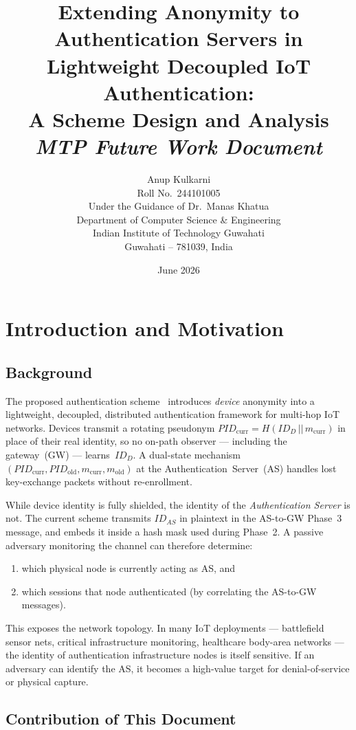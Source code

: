 \documentclass[12pt,a4paper]{article}
\title{%
  \textbf{Extending Anonymity to Authentication Servers in
  Lightweight Decoupled IoT Authentication:}\\[4pt]
  \large A Scheme Design and Analysis\\[8pt]
  \normalsize\textit{MTP Future Work Document}%
}
\author{%
  Anup Kulkarni\\
  Roll No.\ 244101005\\[4pt]
  Under the Guidance of Dr.\ Manas Khatua\\[4pt]
  Department of Computer Science \& Engineering\\
  Indian Institute of Technology Guwahati\\
  Guwahati -- 781039, India
}
\date{June 2026}
\newcommand{\IDd}{\mathit{ID}_D}
\newcommand{\IDas}{\mathit{ID}_{AS}}
\newcommand{\PIDcurr}{\mathit{PID}_{\mathrm{curr}}}
\newcommand{\PIDown}{\mathit{PID}_{\mathrm{old}}}
\newcommand{\mcurr}{m_{\mathrm{curr}}}
\newcommand{\mold}{m_{\mathrm{old}}}
\begin{document}
\maketitle
\tableofcontents
\newpage

\section{Introduction and Motivation}

\subsection{Background}

The proposed authentication scheme~\cite{das2026comsnets} introduces
\emph{device} anonymity into a lightweight, decoupled, distributed
authentication framework for multi-hop IoT networks.
Devices transmit a rotating pseudonym
$\PIDcurr = H(\IDd \,||\, \mcurr)$ in place of their real identity,
so no on-path observer --- including the gateway~(GW) --- learns~$\IDd$.
A dual-state mechanism~$(\PIDcurr, \PIDown, \mcurr, \mold)$ at the
Authentication~Server~(AS) handles lost key-exchange packets without
re-enrollment.

While device identity is fully shielded, the identity of the
\emph{Authentication Server} is not.
The current scheme transmits $\IDas$ in plaintext in the AS-to-GW
Phase~3 message, and embeds it inside a hash mask used during Phase~2.
A passive adversary monitoring the channel can therefore determine:
\begin{enumerate}
  \item which physical node is currently acting as AS, and
  \item which sessions that node authenticated (by correlating
        the AS-to-GW messages).
\end{enumerate}

This exposes the network topology.  In many IoT deployments ---
battlefield sensor nets, critical infrastructure monitoring,
healthcare body-area networks --- the identity of authentication
infrastructure nodes is itself sensitive.  If an adversary can
identify the AS, it becomes a high-value target for denial-of-service
or physical capture.

\subsection{Contribution of This Document}
\end{document}
